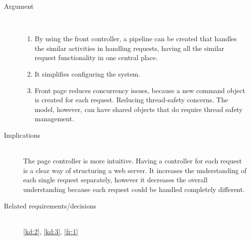 \begin{description}
\item [Argument]~
\begin{enumerate}
\item By using the front controller, a pipeline can be created that handles the similar activities in handling requests, having all the similar request functionality in one central place.
\item It simplifies configuring the system.
\item Front page reduces concurrency issues, because a new command object is created for each request. Reducing thread-safety concerns. The model, however, can have shared objects that do require thread safety management.
\end{enumerate}

\item [Implications]~\\
The page controller is more intuitive. Having a controller for each request is a clear way of structuring a web server. It increases the understanding of each single request separately, however it decreases the overall understanding because each request could be handled completely different.

\item [Related requirements/decisions]~\\
\ref{kd:2}, \ref{kd:3}, \ref{fr:1}

\end{description}

%
